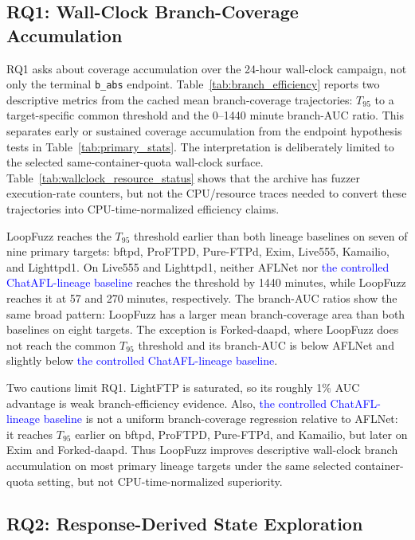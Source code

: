\documentclass[final,5p,times,number]{elsarticle}
\begin{document}
\subsection{RQ1: Wall-Clock Branch-Coverage Accumulation}
RQ1 asks about coverage accumulation over the 24-hour wall-clock campaign, not only the terminal \texttt{b\_abs} endpoint. Table~\ref{tab:branch_efficiency} reports two descriptive metrics from the cached mean branch-coverage trajectories: $T_{95}$ to a target-specific common threshold and the 0--1440 minute branch-AUC ratio. This separates early or sustained coverage accumulation from the endpoint hypothesis tests in Table~\ref{tab:primary_stats}. The interpretation is deliberately limited to the selected same-container-quota wall-clock surface. Table~\ref{tab:wallclock_resource_status} shows that the archive has fuzzer execution-rate counters, but not the CPU/resource traces needed to convert these trajectories into CPU-time-normalized efficiency claims.

LoopFuzz reaches the $T_{95}$ threshold earlier than both lineage baselines on seven of nine primary targets: bftpd, ProFTPD, Pure-FTPd, Exim, Live555, Kamailio, and Lighttpd1. On Live555 and Lighttpd1, neither AFLNet nor \textcolor{blue}{the controlled ChatAFL-lineage baseline} reaches the threshold by 1440 minutes, while LoopFuzz reaches it at 57 and 270 minutes, respectively. The branch-AUC ratios show the same broad pattern: LoopFuzz has a larger mean branch-coverage area than both baselines on eight targets. The exception is Forked-daapd, where LoopFuzz does not reach the common $T_{95}$ threshold and its branch-AUC is below AFLNet and slightly below \textcolor{blue}{the controlled ChatAFL-lineage baseline}.

Two cautions limit RQ1. LightFTP is saturated, so its roughly 1\% AUC advantage is weak branch-efficiency evidence. Also, \textcolor{blue}{the controlled ChatAFL-lineage baseline} is not a uniform branch-coverage regression relative to AFLNet: it reaches $T_{95}$ earlier on bftpd, ProFTPD, Pure-FTPd, and Kamailio, but later on Exim and Forked-daapd. Thus LoopFuzz improves descriptive wall-clock branch accumulation on most primary lineage targets under the same selected container-quota setting, but not CPU-time-normalized superiority.

\subsection{RQ2: Response-Derived State Exploration}
\end{document}
